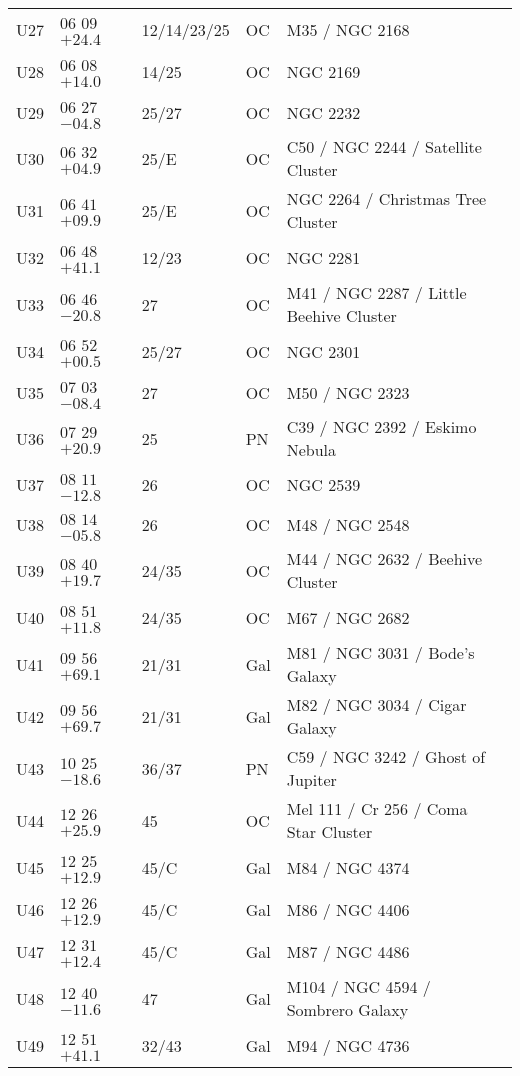 \begin{table}[p]
\begin{tabular}{llllll}
U27&$06$ $09$ $+24.4$&12/14/23/25&OC&M35 / NGC 2168\\
U28&$06$ $08$ $+14.0$&14/25&OC&NGC 2169\\
U29&$06$ $27$ $-04.8$&25/27&OC&NGC 2232\\
U30&$06$ $32$ $+04.9$&25/E&OC&C50 / NGC 2244  / Satellite Cluster\\
U31&$06$ $41$ $+09.9$&25/E&OC&NGC 2264 / Christmas Tree Cluster\\
U32&$06$ $48$ $+41.1$&12/23&OC&NGC 2281\\
U33&$06$ $46$ $-20.8$&27&OC&M41 / NGC 2287 / Little Beehive Cluster\\
U34&$06$ $52$ $+00.5$&25/27&OC&NGC 2301\\
U35&$07$ $03$ $-08.4$&27&OC&M50 / NGC 2323\\
U36&$07$ $29$ $+20.9$&25&PN&C39 / NGC 2392 / Eskimo Nebula\\
U37&$08$ $11$ $-12.8$&26&OC&NGC 2539\\
U38&$08$ $14$ $-05.8$&26&OC&M48 / NGC 2548\\
U39&$08$ $40$ $+19.7$&24/35&OC&M44 / NGC 2632 / Beehive Cluster\\
U40&$08$ $51$ $+11.8$&24/35&OC&M67 / NGC 2682\\
U41&$09$ $56$ $+69.1$&21/31&Gal&M81 / NGC 3031 / Bode’s Galaxy\\
U42&$09$ $56$ $+69.7$&21/31&Gal&M82 / NGC 3034 / Cigar Galaxy\\
U43&$10$ $25$ $-18.6$&36/37&PN&C59 / NGC 3242 / Ghost of Jupiter\\
U44&$12$ $26$ $+25.9$&45&OC&Mel 111 / Cr 256 / Coma Star Cluster\\
U45&$12$ $25$ $+12.9$&45/C&Gal&M84 / NGC 4374\\
U46&$12$ $26$ $+12.9$&45/C&Gal&M86 / NGC 4406\\
U47&$12$ $31$ $+12.4$&45/C&Gal&M87 / NGC 4486\\
U48&$12$ $40$ $-11.6$&47&Gal&M104 / NGC 4594 / Sombrero Galaxy\\
U49&$12$ $51$ $+41.1$&32/43&Gal&M94 / NGC 4736\\
\hline
\end{tabular}
\end{table}
\clearpage

